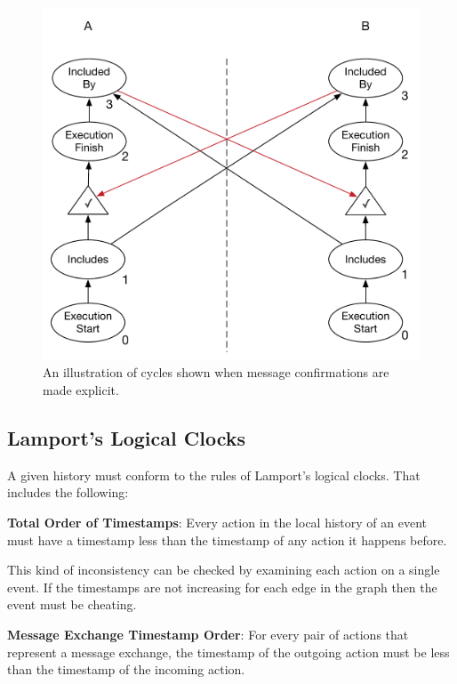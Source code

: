 	\begin{figure}[H]
		\centering
		\includegraphics[height=0.3\textheight]{5validation/images/total-order-of-counterpart-timestamps-cycle-confirmation.pdf}
		\caption{An illustration of cycles shown when message confirmations are made explicit.}
		\label{fig:validation:explicit-message-confirmations}
	\end{figure}
	
	\subsection{Lamport's Logical Clocks}
	A given history must conform to the rules of Lamport's logical clocks. That includes the following:
	
	\begin{ruledef}
		\textbf{Total Order of Timestamps}: Every action in the local history of an event must have a timestamp less than the timestamp of any action it happens before.
		\label{rule:total-order-timestamps}
	\end{ruledef}
	
	\noindent This kind of inconsistency can be checked by examining each action on a single event. If the timestamps are not increasing for each edge in the graph then the event must be cheating.
	
	\begin{ruledef}
		\textbf{Message Exchange Timestamp Order}: For every pair of actions that represent a message exchange, the timestamp of the outgoing action must be less than the timestamp of the incoming action.
		\label{rule:message-exchange-timestamp-order}
	\end{ruledef}
	
